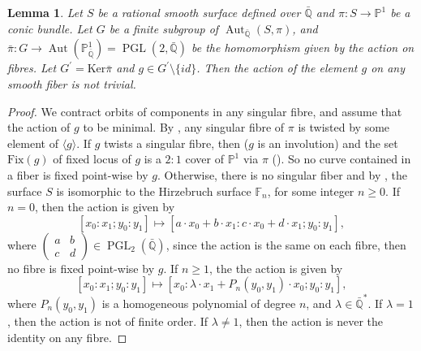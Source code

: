 \documentclass[leqno,12pt]{amsart} %
\newtheorem{lem}[thm]{Lemma}
\newcommand{\Q}{\ensuremath{\mathbb{Q} }}
\newcommand{\F}{\ensuremath{\mathbb{F} }}
\newcommand{\p}{\ensuremath{\mathbb{P} }}
\DeclareMathOperator{\PGL}{PGL}
\DeclareMathOperator{\Aut}{Aut}
\begin{document}
\begin{lem}\label{lemm-12}
    Let $S$ be a rational smooth surface defined over $\bar{\Q}$ and $\pi:S\rightarrow \p^1$ be a conic bundle. Let $G$ be a finite subgroup of $\Aut_{\bar{\Q}}(S,\pi)$, and $\bar{\pi} : G\rightarrow \Aut(\p^1_{\bar{\Q}})= \PGL (2,\bar{\Q })$ be the homomorphism given by the action on fibres. Let $G^{\prime}=\mathrm{Ker}\bar{\pi}$ and $g\in G^{\prime}\setminus\{id\}$. Then the action of the element $g$ on any smooth fiber is not trivial.
\end{lem}
\begin{proof} 
We contract orbits of components in any singular fibre, and assume that the action of $g$ to be minimal. By \cite[Lemma 3.8]{MR2486798}, any singular fibre of $\pi$ is twisted by some element of $\langle g\rangle$. If $g$ twists a singular fibre, then ($g$ is an involution) and the set $\mathrm{Fix}(g)$ of fixed locus of $g$ is a $2:1$ cover of $\p^1$ via $\pi$ (\cite[Lemma $6.1$]{MR2486798}). So no curve contained in a fiber is fixed point-wise by $g$. Otherwise, there is no singular fiber and by \cite[Lemma 3.2.]{MR2486798}, the surface $S$ is isomorphic to the Hirzebruch surface $\F _n$, for some integer $n \ge 0$. If $n=0$, then the action is given by \[[x_0:x_1;y_0:y_1]\mapsto [a\cdot x_0+b\cdot x_1:c\cdot x_0+d\cdot x_1;y_0:y_1],\]
where $\left(\begin{array}{cc} a&b\\c&d \end{array}\right)\in\PGL _2(\bar{\Q })$, since the action is the same on each fibre, then no fibre is fixed point-wise by $g$. If $n\ge1$, the the action is given by \[[x_0:x_1;y_0:y_1]\mapsto [x_0:\lambda \cdot x_1 +P_n(y_0,y_1)\cdot x_0;y_0:y_1],\] where $P_n(y_0,y_1)$ is a homogeneous polynomial of degree $n$, and $\lambda\in\bar{\Q }^*$. If $\lambda=1$, then the action is not of finite order. If $\lambda\neq1$, then the action is never the identity on any fibre. 
\end{proof}
\end{document}
